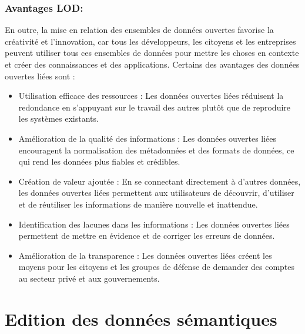 \documentclass[12pt]{report}
\begin{document}
\subsubsection{Avantages LOD:}
En outre, la mise en relation des ensembles de données ouvertes favorise la créativité et l'innovation, car
tous les développeurs, les citoyens et les entreprises peuvent utiliser tous ces ensembles de données pour
mettre les choses en contexte et créer des connaissances et des applications.
Certains des avantages des données ouvertes liées sont :
\begin{itemize}
 \item Utilisation efficace des ressources : Les données ouvertes liées réduisent la redondance en s'appuyant sur
le travail des autres plutôt que de reproduire les systèmes existants.
\item Amélioration de la qualité des informations : Les données ouvertes liées encouragent la normalisation des
métadonnées et des formats de données, ce qui rend les données plus fiables et crédibles.
\item Création de valeur ajoutée : En se connectant directement à d'autres données, les données ouvertes liées
permettent aux utilisateurs de découvrir, d'utiliser et de réutiliser les informations de manière nouvelle et
inattendue.
\item Identification des lacunes dans les informations : Les données ouvertes liées permettent de mettre en
évidence et de corriger les erreurs de données.
\item Amélioration de la transparence : Les données ouvertes liées créent les moyens pour les citoyens et les
groupes de défense de demander des comptes au secteur privé et aux gouvernements.
\end{itemize}

\section{Edition des données sémantiques}
\end{document}
